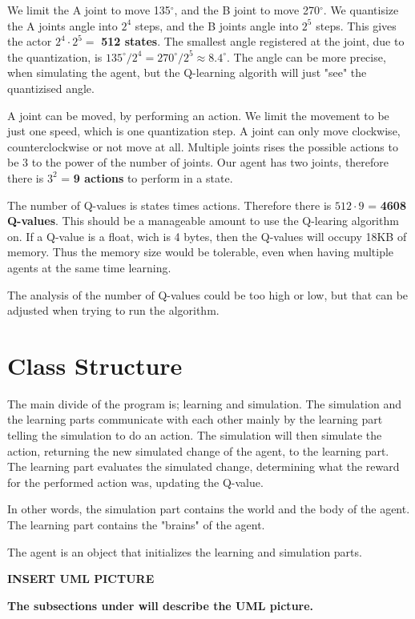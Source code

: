 \documentclass{article}
\begin{document}
We limit the A joint to move 135$^\circ$, and the B joint to move
270$^\circ$. We quantisize the A joints angle into $2^4$ steps, and
the B joints angle into $2^5$ steps. This gives the actor
$2^4 \cdot 2^5 =$ \textbf{512 states}. The smallest angle registered at
the joint, due to the quantization, is
$135^\circ / 2^4 = 270^\circ / 2^5 \approx 8.4^\circ$.
The angle can be more precise, when simulating the agent, but the
Q-learning algorith will just "see" the quantizised angle.

A joint can be moved, by performing an action. We limit the movement to be
just one speed, which is one quantization step. A joint can only move
clockwise, counterclockwise or not move at all. Multiple joints rises the
possible actions to be 3 to the power of the number of joints. Our
agent has two joints, therefore there is $3^2$ = \textbf{9 actions} to
perform in a state.

The number of Q-values is states times actions. Therefore there is
$512 \cdot 9$ = \textbf{4608 Q-values}. This should be a manageable
amount to use the Q-learing algorithm on. If a Q-value is a float,
wich is 4 bytes, then the Q-values will occupy 18KB of memory.
Thus the memory size would be tolerable, even when having multiple agents
at the same time learning.

The analysis of the number of Q-values could be too high or low, but that
can be adjusted when trying to run the algorithm.



\section{Class Structure}
The main divide of the program is; learning and simulation. The
simulation and the learning parts communicate with each other mainly by the
learning part telling the simulation to do an action. The simulation will then
simulate the action, returning the new simulated change of the agent, to the
learning part. The learning part evaluates the simulated change, determining
what the reward for the performed action was, updating the Q-value.

In other words, the simulation part contains the world and the body of the agent.
The learning part contains the "brains" of the agent.

The agent is an object that initializes the learning and simulation parts.

\textbf{INSERT UML PICTURE}

\textbf{The subsections under will describe the UML picture.}
\end{document}
